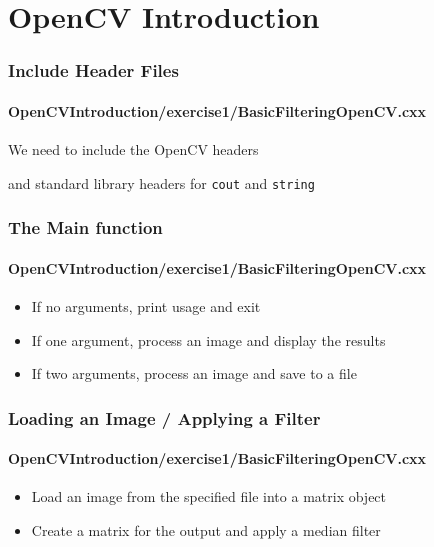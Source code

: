 \section{OpenCV Introduction}






\begin{frame}
\frametitle{Include Header Files}
\framesubtitle{OpenCVIntroduction/exercise1/BasicFilteringOpenCV.cxx}
\begin{center}
We need to include the OpenCV headers

\pause
\vspace{1 em}
and standard library headers for {\tt cout} and {\tt string}

\end{center}

\end{frame}


\begin{frame}
\frametitle{The Main function}
\framesubtitle{OpenCVIntroduction/exercise1/BasicFilteringOpenCV.cxx}
\begin{center}

\begin{itemize}
\item If no arguments, print usage and exit
\item If one argument, process an image and display the results
\item If two arguments, process an image and save to a file
\end{itemize}
\end{center}

\end{frame}


\begin{frame}
\frametitle{Loading an Image / Applying a Filter}
\framesubtitle{OpenCVIntroduction/exercise1/BasicFilteringOpenCV.cxx}
\begin{center}
\begin{itemize}
\item Load an image from the specified file into a matrix object
\end{itemize}

\pause
\begin{itemize}
\item Create a matrix for the output and apply a median filter
\end{itemize}

\end{center}

\end{frame}


